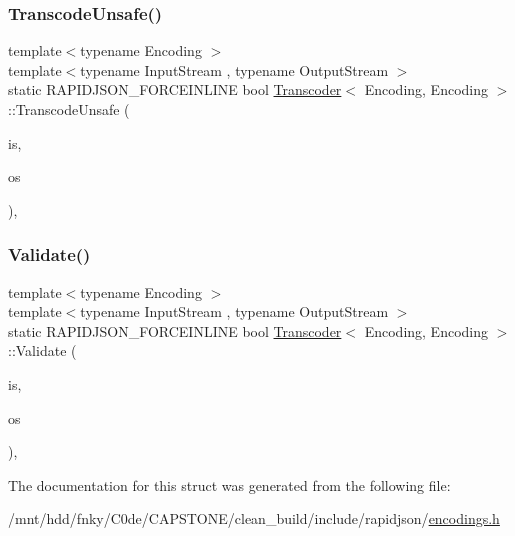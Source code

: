 \subsubsection{\texorpdfstring{Transcode\+Unsafe()}{TranscodeUnsafe()}}
{\footnotesize\ttfamily template$<$typename Encoding $>$ \\
template$<$typename Input\+Stream , typename Output\+Stream $>$ \\
static R\+A\+P\+I\+D\+J\+S\+O\+N\+\_\+\+F\+O\+R\+C\+E\+I\+N\+L\+I\+NE bool \hyperlink{structTranscoder}{Transcoder}$<$ Encoding, Encoding $>$\+::Transcode\+Unsafe (\begin{DoxyParamCaption}\item[{Input\+Stream \&}]{is,  }\item[{Output\+Stream \&}]{os }\end{DoxyParamCaption})\hspace{0.3cm}{\ttfamily [inline]}, {\ttfamily [static]}}

\mbox{\label{structTranscoder_3_01Encoding_00_01Encoding_01_4_a536aa3930251161d05e112947ec2f9c8}} 
\subsubsection{\texorpdfstring{Validate()}{Validate()}}
{\footnotesize\ttfamily template$<$typename Encoding $>$ \\
template$<$typename Input\+Stream , typename Output\+Stream $>$ \\
static R\+A\+P\+I\+D\+J\+S\+O\+N\+\_\+\+F\+O\+R\+C\+E\+I\+N\+L\+I\+NE bool \hyperlink{structTranscoder}{Transcoder}$<$ Encoding, Encoding $>$\+::Validate (\begin{DoxyParamCaption}\item[{Input\+Stream \&}]{is,  }\item[{Output\+Stream \&}]{os }\end{DoxyParamCaption})\hspace{0.3cm}{\ttfamily [inline]}, {\ttfamily [static]}}



The documentation for this struct was generated from the following file\+:\begin{DoxyCompactItemize}
\item 
/mnt/hdd/fnky/\+C0de/\+C\+A\+P\+S\+T\+O\+N\+E/clean\+\_\+build/include/rapidjson/\hyperlink{encodings_8h}{encodings.\+h}\end{DoxyCompactItemize}
